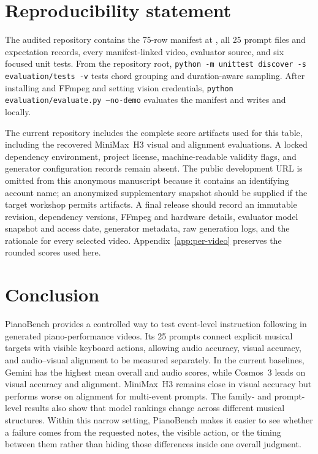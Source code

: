 \documentclass{article}
\begin{document}
\section{Reproducibility statement}
\label{sec:reproducibility}

The audited repository contains the 75-row manifest at , all 25 prompt files and expectation records, every manifest-linked video, evaluator source, and six focused unit tests. From the repository root, \texttt{python -m unittest discover -s evaluation/tests -v} tests chord grouping and duration-aware sampling. After installing  and FFmpeg and setting vision credentials, \texttt{python evaluation/evaluate.py --no-demo} evaluates the manifest and writes  and  locally.

The current repository includes the complete score artifacts used for this table, including the recovered MiniMax~H3 visual and alignment evaluations. A locked dependency environment, project license, machine-readable validity flags, and generator configuration records remain absent. The public development URL is omitted from this anonymous manuscript because it contains an identifying account name; an anonymized supplementary snapshot should be supplied if the target workshop permits artifacts. A final release should record an immutable revision, dependency versions, FFmpeg and hardware details, evaluator model snapshot and access date, generator metadata, raw generation logs, and the rationale for every selected video. Appendix~\ref{app:per-video} preserves the rounded scores used here.

\section{Conclusion}
\label{sec:conclusion}

PianoBench provides a controlled way to test event-level instruction following in generated piano-performance videos. Its 25 prompts connect explicit musical targets with visible keyboard actions, allowing audio accuracy, visual accuracy, and audio--visual alignment to be measured separately. In the current baselines, Gemini has the highest mean overall and audio scores, while Cosmos~3 leads on visual accuracy and alignment. MiniMax~H3 remains close in visual accuracy but performs worse on alignment for multi-event prompts. The family- and prompt-level results also show that model rankings change across different musical structures. Within this narrow setting, PianoBench makes it easier to see whether a failure comes from the requested notes, the visible action, or the timing between them rather than hiding those differences inside one overall judgment.
\end{document}
